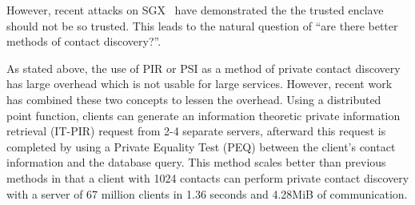 However, recent attacks on SGX~\cite{van2018foreshadow} have demonstrated the
the trusted enclave should not be so trusted. This leads to the natural question
of ``are there better methods of contact discovery?''. 

As stated above, the use of PIR or PSI as a method of private contact discovery
has large overhead which is not usable for large services. However, recent
work~\cite{demmler2018pir} has combined these two concepts to lessen the
overhead. Using a distributed point function, clients can generate an
information theoretic private information retrieval (IT-PIR) request from 2-4
separate servers, afterward this request is completed by using a Private
Equality Test (PEQ) between the client's contact information and the database
query. This method scales better than previous methods in that a client with
1024 contacts can perform private contact discovery with a server of 67 million
clients in 1.36 seconds and 4.28MiB of communication.

